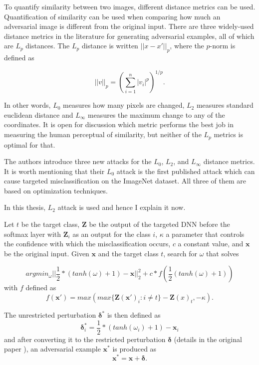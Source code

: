 
To quantify similarity between two images, different distance metrics can be used. Quantification of similarity can be used when comparing how much an adversarial image is different from the original input. There are three widely-used distance metrics in the literature for generating adversarial examples, all of which are $L_p$ distances. The $L_p$ distance is written $||x - x'||_p$, where the $p$-norm is defined as

\[
||v||_p =( \sum_{i = 1}^{n} |v_i|^p)^{1/p}. 
\]

In other words, $L_0$ measures how many pixels are changed, $L_2$ measures standard euclidean distance and $L_\infty$ measures the maximum change to any of the coordinates. It is open for discussion which metric performs the best job in measuring the human perceptual of similarity, but neither of the $L_p$ metrics is optimal for that.


The authors \cite{DBLP:journals/corr/CarliniW16a} introduce three new attacks for the $L_0$, $L_2$, and $L_{ \infty }$ distance metrics. It is worth mentioning that their $L_0$ attack is the first published attack which can cause targeted misclassification on the ImageNet dataset. All three of them are based on optimization techniques.

In this thesis, $L_2$ attack is used and hence I explain it now.

Let $t$ be the target class, $\pmb Z$ be the output of the targeted DNN before the softmax layer with $\pmb Z_i$ as an output for the class $i$, $\kappa$ a parameter that controls the confidence with which the misclassification occurs, $c$ a constant value, and $\pmb x$ be the original input.
Given $\pmb x$ and the target class $t$, search for $\omega$ that solves

\[
argmin_{\omega} ||\frac{1}{2}*(tanh(\omega) + 1) - \pmb x||_2^2 + c * f(\frac{1}{2}(tanh(\omega) + 1))
\]
with $f$ defined as 
\[
f(\pmb x') = max(max\{\pmb Z(\pmb x ')_i : i \neq t\} - \pmb Z(x)_t, - \kappa).
\]

The unrestricted perturbation $\pmb \delta^*$ is then defined as 
\[
	\pmb \delta^*_i = \frac{1}{2} * (tanh ( \omega_i) + 1) - \pmb x_i
\]
and after converting it to the restricted perturbation $\pmb \delta$ (details in the original paper \cite{DBLP:journals/corr/CarliniW16a}), an adversarial example $\pmb x^*$ is produced as 
\[
\pmb x^* = \pmb x +\pmb  \delta.
\]

